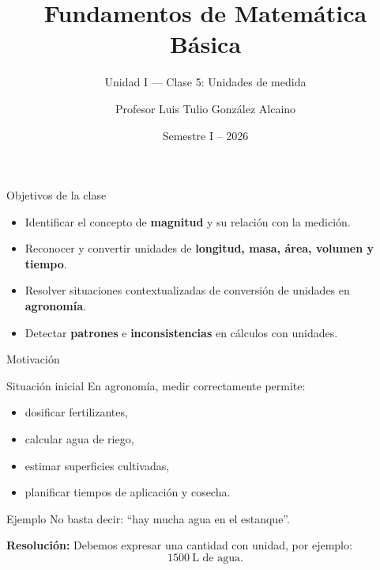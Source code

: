 \documentclass[handout,aspectratio=169,10pt]{beamer}
\title[MAT Básica]{Fundamentos de Matemática Básica}
\subtitle{Unidad I --- Clase 5: Unidades de medida}
\author{Profesor Luis Tulio González Alcaino}
\institute{Universidad Santo Tomás \\ Departamento Ciencias Básicas --- Talca}
\date{Semestre I -- 2026}
\newcommand{\ejemplo}[2]{
	\begin{exampleblock}{Ejemplo}
		#1
		
		\vspace{0.5em}
		\textbf{Resolución:} #2
	\end{exampleblock}
}
\begin{document}
	
	\begin{frame}
		\titlepage
	\end{frame}
	
	\begin{frame}{Objetivos de la clase}
		\begin{itemize}[<+->]
			\item Identificar el concepto de \textbf{magnitud} y su relación con la medición.
			\item Reconocer y convertir unidades de \textbf{longitud, masa, área, volumen y tiempo}.
			\item Resolver situaciones contextualizadas de conversión de unidades en \textbf{agronomía}.
			\item Detectar \textbf{patrones} e \textbf{inconsistencias} en cálculos con unidades.
		\end{itemize}
	\end{frame}
	
	\begin{frame}{Motivación}
		\begin{block}{Situación inicial}
			En agronomía, medir correctamente permite:
			\begin{itemize}[<+->]
				\item dosificar fertilizantes,
				\item calcular agua de riego,
				\item estimar superficies cultivadas,
				\item planificar tiempos de aplicación y cosecha.
			\end{itemize}
		\end{block}
		
		\pause
		\ejemplo
		{No basta decir: ``hay mucha agua en el estanque''.}
		{Debemos expresar una cantidad con unidad, por ejemplo:
			\[
			1500\ \text{L de agua}.
			\]
		}
	\end{frame}
	
\end{document}
